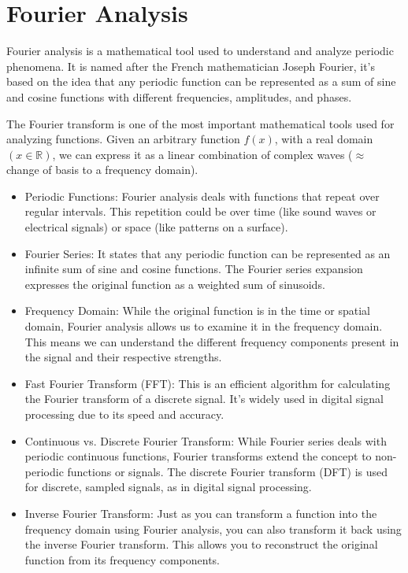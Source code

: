 \chapter{Fourier Analysis}

Fourier analysis is a mathematical tool used to understand and analyze periodic phenomena. It is named after the French mathematician Joseph Fourier, it's based on the idea that any periodic function can be represented as a sum of sine and cosine functions with different frequencies, amplitudes, and phases.

The Fourier transform is one of the most important mathematical tools used for analyzing functions. Given an arbitrary function $f(x)$, with a real domain $(x \in \mathbb{R})$, we can express it as a linear combination of complex waves ($\approx$ change of basis to a frequency domain). 

\begin{itemize}
	\item Periodic Functions: Fourier analysis deals with functions that repeat over regular intervals. This repetition could be over time (like sound waves or electrical signals) or space (like patterns on a surface).
	\item Fourier Series: It states that any periodic function can be represented as an infinite sum of sine and cosine functions. The Fourier series expansion expresses the original function as a weighted sum of sinusoids.
	\item Frequency Domain: While the original function is in the time or spatial domain, Fourier analysis allows us to examine it in the frequency domain. This means we can understand the different frequency components present in the signal and their respective strengths.
	\item Fast Fourier Transform (FFT): This is an efficient algorithm for calculating the Fourier transform of a discrete signal. It's widely used in digital signal processing due to its speed and accuracy.
	\item Continuous vs. Discrete Fourier Transform: While Fourier series deals with periodic continuous functions, Fourier transforms extend the concept to non-periodic functions or signals. The discrete Fourier transform (DFT) is used for discrete, sampled signals, as in digital signal processing.
	\item Inverse Fourier Transform: Just as you can transform a function into the frequency domain using Fourier analysis, you can also transform it back using the inverse Fourier transform. This allows you to reconstruct the original function from its frequency components.
\end{itemize}

